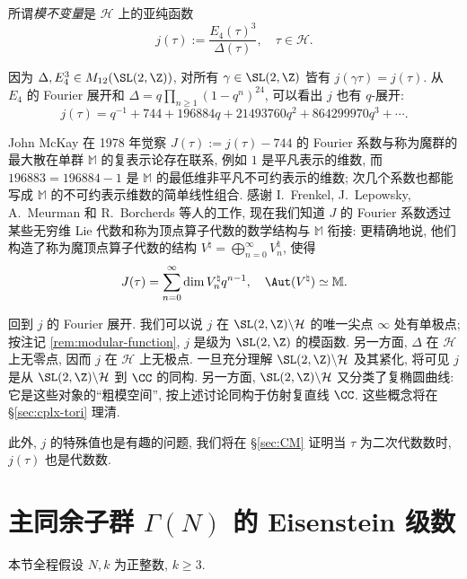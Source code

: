 \begin{definition}\label{def:modular-invariant}  
	所谓\emph{模不变量}是 $\mathcal{H}$ 上的亚纯函数
	\[ j(\tau) := \dfrac{E_4(\tau)^3}{\Delta(\tau)}, \quad \tau \in \mathcal{H}. \]
\end{definition}
因为 $\Delta, E_4^3 \in M_{12}(\SL(2,\Z))$, 对所有 $\gamma \in \SL(2,\Z)$ 皆有 $j(\gamma\tau) = j(\tau)$. 从 $E_4$ 的 Fourier 展开和 $\Delta = q\prod_{n \geq 1}(1-q^n)^{24}$, 可以看出 $j$ 也有 $q$-展开:
\[ j(\tau) = q^{-1} + 744 + 196884 q + 21493760 q^2 + 864299970 q^3 + \cdots. \]

John McKay 在 1978 年觉察 $J(\tau) := j(\tau) - 744$ 的 Fourier 系数与称为魔群的最大散在单群 $\mathbb{M}$ 的复表示论存在联系, 例如 $1$ 是平凡表示的维数, 而 $196883 = 196884 - 1$ 是 $\mathbb{M}$ 的最低维非平凡不可约表示的维数; 次几个系数也都能写成 $\mathbb{M}$ 的不可约表示维数的简单线性组合. 感谢 I.\ Frenkel, J.\ Lepowsky, A.\ Meurman 和 R.\ Borcherds 等人的工作, 现在我们知道 $J$ 的 Fourier 系数透过某些无穷维 Lie 代数和称为顶点算子代数的数学结构与 $\mathbb{M}$ 衔接: 更精确地说, 他们构造了称为魔顶点算子代数的结构 $V^\natural = \bigoplus_{n=0}^\infty V_n^\natural$, 使得
\[ J(\tau) = \sum_{n=0}^\infty \dim V_n^\natural q^{n-1}, \quad \Aut(V^\natural) \simeq \mathbb{M}. \]

回到 $j$ 的 Fourier 展开. 我们可以说 $j$ 在 $\SL(2,\Z) \backslash \mathcal{H}$ 的唯一尖点 $\infty$ 处有单极点; 按注记 \ref{rem:modular-function}, $j$ 是级为 $\SL(2,\Z)$ 的模函数. 另一方面, $\Delta$ 在 $\mathcal{H}$ 上无零点, 因而 $j$ 在 $\mathcal{H}$ 上无极点. 一旦充分理解 $\SL(2,\Z) \backslash \mathcal{H}$ 及其紧化, 将可见 $j$ 是从 $\SL(2,\Z) \backslash \mathcal{H}$ 到 $\CC$ 的同构. 另一方面, $\SL(2,\Z) \backslash \mathcal{H}$ 又分类了复椭圆曲线: 它是这些对象的``粗模空间'', 按上述讨论同构于仿射复直线 $\CC$. 这些概念将在 \S\ref{sec:cplx-tori} 理清.

此外, $j$ 的特殊值也是有趣的问题, 我们将在 \S\ref{sec:CM} 证明当 $\tau$ 为二次代数数时, $j(\tau)$ 也是代数数.

\section{主同余子群 \texorpdfstring{$\Gamma(N)$}{Gamma(N)} 的 Eisenstein 级数}\label{sec:Eisenstein-congruence-subgroup}
\begin{convention}\label{conv:Eisenstein-Gamma}
	本节全程假设 $N,k$ 为正整数, $k \geq 3$.
\end{convention}


